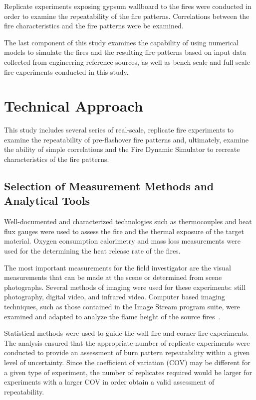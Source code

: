 \documentclass[twoside]{uocthesis}
\begin{document}
Replicate experiments exposing gypsum wallboard to the fires were conducted in order to examine the repeatability of the fire patterns.  Correlations between the fire characteristics and the fire patterns were be examined.

The last component of this study examines the capability of using numerical models to simulate the fires and the resulting fire patterns based on input data collected from engineering reference sources, as well as bench scale and full scale fire experiments conducted in this study.

\section{Technical Approach}


This study includes several series of real-scale, replicate fire experiments to examine the repeatability of pre-flashover fire patterns and, ultimately, examine the ability of simple correlations and the Fire Dynamic Simulator to recreate characteristics of the fire patterns.

\subsection{Selection of Measurement Methods and Analytical Tools}

Well-documented and characterized technologies such as thermocouples and heat flux gauges were used to assess the fire and the thermal exposure of the target material.  Oxygen consumption calorimetry and mass loss measurements were used for the determining the heat release rate of the fires.

The most important measurements for the field investigator are the visual measurements that can be made at the scene or determined from scene photographs. Several methods of imaging were used for these experiments: still photography, digital video, and infrared video.  Computer based imaging techniques, such as those contained in the Image Stream program suite, were examined and adapted to analyze the flame height of the source fires~\cite{Nokes:2011}.

Statistical methods were used to guide the wall fire and corner fire experiments.  The analysis ensured that the appropriate number of replicate experiments were conducted to provide an assessment of burn pattern repeatability within a given level of uncertainty.  Since the coefficient of variation (COV) may be different for a given type of experiment, the number of replicates required would be larger for experiments with a larger COV in order obtain a valid assessment of repeatability.
\end{document}
